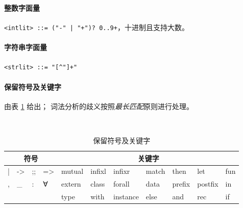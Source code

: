 {\setlength{\parskip}{-1em}
  \paragraph*{整数字面量} \texttt{<intlit> ::= ("-" | "+")? 0..9+}，十进制且支持大数。
  \paragraph*{字符串字面量} \texttt{<strlit> ::= "[^"]+"}
  \paragraph*{保留符号及关键字} 由表 \ref{tab:reserved-symbols} 给出；
  词法分析的歧义按照\emph{最长匹配}原则进行处理。
}

\begin{table}
  \centering
  \caption{保留符号及关键字}\label{tab:reserved-symbols}
  {\tt
    \begin{tabular}{@{}lllllllllll@{}}
      \toprule
      \multicolumn{4}{c}{\textrm{符号}}                & \multicolumn{7}{c}{\textrm{关键字}}                                \\ \midrule
      | & -\textgreater{} & ;; & =\textgreater{} & mutual & infixl & infixr   & match & then   & let     & fun \\
      , & \_              & :  & ∀          & extern & class  & forall   & data  & prefix & postfix & in  \\
      &                 &    &                 & type   & with   & instance & else  & and    & rec     & if \\ \bottomrule
  \end{tabular}}
\end{table}

